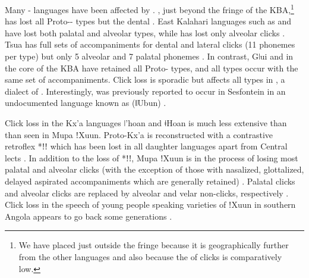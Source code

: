 \documentclass[output=paper
,newtxmath
,modfonts
,nonflat]{langsci/langscibook}
\begin{document}
Many - languages have been affected by  \citep{Traill1997}. , just beyond the fringe of the KBA,\footnote{We have placed  just outside the fringe because it is geographically further from the other languages and also because the  of clicks is comparatively low.} has lost all Proto--  types but the dental \citep{fehn-toappear-a}. East Kalahari  languages such as  and  have lost both palatal and alveolar  types, while  has lost only alveolar clicks \citep{fehn-toappear-a}. Tsua has full sets of accompaniments for dental and lateral clicks (11 phonemes per  type) but only 5 alveolar and 7 palatal  phonemes \citep{Mathes2016}. In contrast, Gǀui and  in the core of the KBA have retained all Proto-  types, and all  types occur with the same set of accompaniments. Click loss is sporadic but affects all  types in  \citep{Job2014}, a dialect of . Interestingly,  was previously reported to occur in Sesfontein in an undocumented  language known as  (ǁUbun) \citep[45]{vanwarmelo1951}. 

Click loss in the Kx'a languages ǀ'hoan and ǂHoan is much less extensive than than seen in Mupa ǃXuun. Proto-Kx'a is reconstructed with a contrastive retroflex  *ǃǃ which has been lost in all daughter languages apart from Central  lects \citep{Heine2010,Sands2010}. In addition to the loss of *ǃǃ, Mupa ǃXuun is in the process of losing most palatal and alveolar clicks (with the exception of those with nasalized, glottalized, delayed aspirated accompaniments which are generally retained) \citep{fehn-toappear-b}. Palatal clicks and alveolar clicks are replaced by alveolar and velar non-clicks, respectively \citep{fehn-toappear-b}. Click loss in the speech of young people speaking varieties of \linebreak ǃXuun in southern Angola appears to go back some generations \citep{Bleek1928,Traill1997}. 
\end{document}
